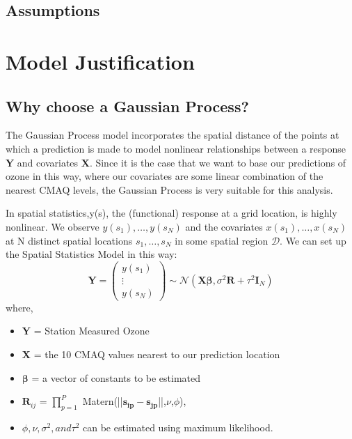\documentclass{article}                                                   %
\def\wl{\par \vspace{\baselineskip}}                                      %
\begin{document}
  \subsection{Assumptions}
\section{Model Justification}
  \subsection{Why choose a Gaussian Process?}
  The Gaussian Process model incorporates the spatial distance of the points 
  at which a prediction is made to model nonlinear relationships between a
  response $\bm Y$ and covariates $\bm X$. Since it is the case that we want
  to base our predictions of ozone in this way, where our covariates are some
  linear combination of the nearest CMAQ levels, the Gaussian Process is very
  suitable for this analysis.
  \wl\noindent
  In spatial statistics,y(s), the (functional) response at a grid location,
  is highly nonlinear. We observe $y(s_1),\ldots,y(s_N)$ and the covariates
  $x(s_1),\ldots,x(s_N)$ at N distinct spatial locations $s_1,\ldots,s_N$
  in some spatial region $\mathcal{D}$.
  We can set up the Spatial Statistics Model in this way:
  \[ \bm Y = \begin{pmatrix} y(s_1) \\ \vdots \\ y(s_N) \end{pmatrix} 
             \sim \mathcal{N}(\bm{X\beta},\sigma^2\bm R + \tau^2\bm I_N) \] 
  where,  \begin{itemize}
            \item $\bm Y$ = Station Measured Ozone
            \item $\bm X$ = the 10 CMAQ values nearest to our prediction location
            \item $\bm\beta$ = a vector of constants to be estimated
            \item $\bm R_{ij}$ = $\prod_{p=1}^P$ 
                                 Matern(||$\bm{s_{ip}-s_{jp}}$||,$\nu$,$\phi$), 
            \item $\phi,\nu,\sigma^2, and \tau^2$ can be estimated using 
                                                  maximum likelihood.
          \end{itemize}
         
\end{document}
